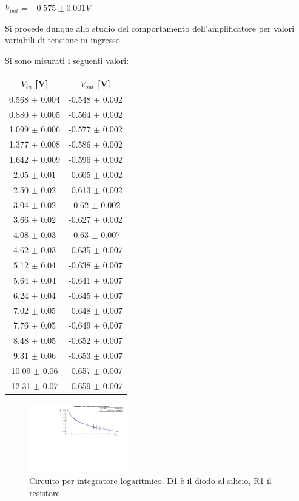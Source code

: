 \documentclass[journal]{IEEEtran}
\begin{document}
$V_{out} = -0.575 \pm 0.001 V$

Si procede dunque allo studio del comportamento dell'amplificatore per valori variabili di tensione in ingresso.

Si sono misurati i seguenti valori:

\begin{tabular}{|c|c|}
\hline
\multicolumn{1}{|c|}{$V_{in}$ {[}V{]}} & \multicolumn{1}{c|}{$V_{out}$ {[}V{]}} \\ \hline
0.568 $\pm$ 0.004 & -0.548 $\pm$ 0.002  \\ \hline
0.880 $\pm$ 0.005 & -0.564 $\pm$ 0.002 \\ \hline
1.099 $\pm$ 0.006 & -0.577 $\pm$ 0.002 \\ \hline
1.377 $\pm$ 0.008 & -0.586 $\pm$ 0.002 \\ \hline
1.642 $\pm$ 0.009 & -0.596 $\pm$ 0.002 \\ \hline
2.05 $\pm$ 0.01 & -0.605 $\pm$ 0.002 \\ \hline
2.50 $\pm$ 0.02 & -0.613 $\pm$ 0.002 \\ \hline
3.04 $\pm$ 0.02 & -0.62 $\pm$ 0.002 \\ \hline
3.66 $\pm$ 0.02 & -0.627 $\pm$ 0.002 \\ \hline
4.08 $\pm$ 0.03 & -0.63 $\pm$ 0.007 \\ \hline
4.62 $\pm$ 0.03 & -0.635 $\pm$ 0.007 \\ \hline
5.12 $\pm$ 0.04 & -0.638 $\pm$ 0.007 \\ \hline
5.64 $\pm$ 0.04 & -0.641 $\pm$ 0.007 \\ \hline
6.24 $\pm$ 0.04 & -0.645 $\pm$ 0.007 \\ \hline
7.02 $\pm$ 0.05 & -0.648 $\pm$ 0.007 \\ \hline
7.76 $\pm$ 0.05 & -0.649 $\pm$ 0.007 \\ \hline
8.48 $\pm$ 0.05 & -0.652 $\pm$ 0.007 \\ \hline
9.31 $\pm$ 0.06 & -0.653 $\pm$ 0.007 \\ \hline
10.09 $\pm$ 0.06 & -0.657 $\pm$ 0.007 \\ \hline
12.31 $\pm$ 0.07 & -0.659 $\pm$ 0.007 \\ \hline
\end{tabular}

\begin{figure}[H]%
\begin {center}
\includegraphics[width=0.38\textwidth]{analysis/output/fit_log_vout_vin.pdf}
\caption{Circuito per integratore logaritmico. D1 è il diodo al silicio, R1 il resistore}
\label{fig:oscilloscope}
\end {center}
\end{figure}
\end{document}
